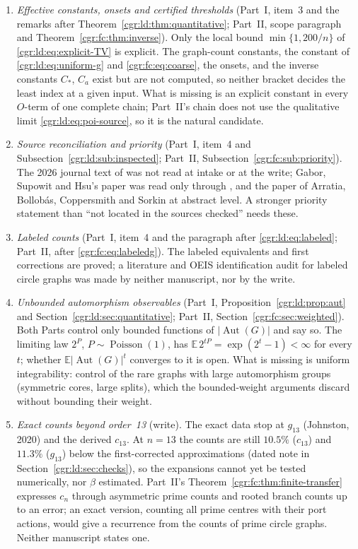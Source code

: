 \documentclass[11pt,letterpaper]{article}
\numberwithin{equation}{section}
\theoremstyle{definition}\newtheorem{definition}[theorem]{Definition}
\theoremstyle{remark}\newtheorem{remark}[theorem]{Remark}
\newcommand{\EE}{\mathbb E}
\DeclareMathOperator{\Aut}{Aut}
\DeclareMathOperator{\Poi}{Poisson}
\begin{document}
\begin{enumerate}
\item\label{cgr:q:effective} \emph{Effective constants, onsets and certified thresholds} (Part~I, item~3 and the remarks after Theorem~\ref{cgr:ld:thm:quantitative}; Part~II, scope paragraph and Theorem~\ref{cgr:fc:thm:inverse}). Only the local bound $\min\{1,200/n\}$ of \eqref{cgr:ld:eq:explicit-TV} is explicit. The graph-count constants, the constant of \eqref{cgr:ld:eq:uniform-g} and \eqref{cgr:fc:eq:coarse}, the onsets, and the inverse constants $C_*$, $C_a$ exist but are not computed, so neither bracket decides the least index at a given input. What is missing is an explicit constant in every $O$-term of one complete chain; Part~II's chain does not use the qualitative limit \eqref{cgr:ld:eq:poi-source}, so it is the natural candidate.
\item\label{cgr:q:sources} \emph{Source reconciliation and priority} (Part~I, item~4 and Subsection~\ref{cgr:ld:sub:inspected}; Part~II, Subsection~\ref{cgr:fc:sub:priority}). The 2026 journal text of \cite{BBFGP24} was not read at intake or at the write; Gabor, Supowit and Hsu's paper was read only through \cite[Proposition 5.12]{BBFGP24}, and the paper of Arratia, Bollob\'as, Coppersmith and Sorkin at abstract level. A stronger priority statement than ``not located in the sources checked'' needs these.
\item\label{cgr:q:labeled} \emph{Labeled counts} (Part~I, item~4 and the paragraph after \eqref{cgr:ld:eq:labeled}; Part~II, after \eqref{cgr:fc:eq:labeledg}). The labeled equivalents and first corrections are proved; a literature and OEIS identification audit for labeled circle graphs was made by neither manuscript, nor by the write.
\item\label{cgr:q:moments} \emph{Unbounded automorphism observables} (Part~I, Proposition~\ref{cgr:ld:prop:aut} and Section~\ref{cgr:ld:sec:quantitative}; Part~II, Section~\ref{cgr:fc:sec:weighted}). Both Parts control only bounded functions of $|\Aut(G)|$ and say so. The limiting law $2^P$, $P\sim\Poi(1)$, has $\EE\,2^{tP}=\exp(2^t-1)<\infty$ for every $t$; whether $\EE|\Aut(G)|^t$ converges to it is open. What is missing is uniform integrability: control of the rare graphs with large automorphism groups (symmetric cores, large splits), which the bounded-weight arguments discard without bounding their weight.
\item\label{cgr:q:data} \emph{Exact counts beyond order~13} (write). The exact data stop at $g_{13}$ (Johnston, 2020) and the derived $c_{13}$. At $n=13$ the counts are still $10.5\%$ ($c_{13}$) and $11.3\%$ ($g_{13}$) below the first-corrected approximations (dated note in Section~\ref{cgr:ld:sec:checks}), so the expansions cannot yet be tested numerically, nor $\beta$ estimated. Part~II's Theorem~\ref{cgr:fc:thm:finite-transfer} expresses $c_n$ through asymmetric prime counts and rooted branch counts up to an error; an exact version, counting all prime centres with their port actions, would give a recurrence from the counts of prime circle graphs. Neither manuscript states one.
\end{enumerate}
\end{document}
